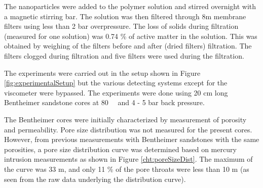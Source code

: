 \documentclass[journal = enfuem, manuscript =  article]{achemso}
\begin{document}
The nanoparticles were added to the polymer solution and stirred overnight with a magnetic stirring bar. The solution was then filtered through 8\micro m membrane filters using less than 2 bar overpressure. The loss of solids during filtration (measured for one solution) was 0.74 \% of active matter in the solution. This was obtained by weighing of the filters before and after (dried filters) filtration. The filters clogged during filtration and five filters were used during the filtration.

The experiments were carried out in the setup shown in Figure \ref{fig:experimentalSetup} but the various detecting systems except for the viscometer were bypassed. The experiments were done using 20 cm long Bentheimer sandstone cores at 80~\celsius~ and 4 - 5 bar back pressure.

\begin{figure}[hp]
\end{figure}

The Bentheimer cores were initially characterized by measurement of porosity and permeability. Pore size distribution was not measured for the present cores. However, from previous measurements with Bentheimer sandstones with the same porosities, a pore size distribution curve was determined based on mercury intrusion measurements as shown in Figure \ref{cht:poreSizeDist}. The maximum of the curve was 33 \micro m, and only 11 \% of the pore throats were less than 10 \micro m (as seen from the raw data underlying the distribution curve).
\end{document}
